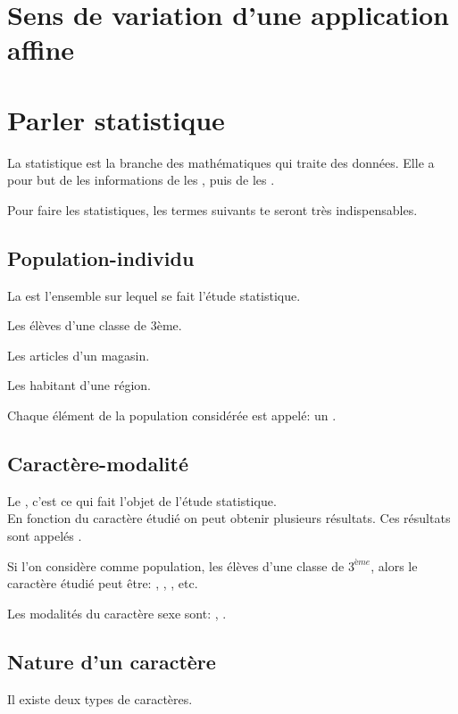 \documentclass[12pt,a4paper]{report}
\begin{document}
\chapter{Sens de variation d'une application affine}

\chapter{Parler statistique}
La statistique est la branche des mathématiques qui traite des données. Elle a pour but de  les informations de les , puis de les .
\par
Pour faire les statistiques, les termes suivants te seront très indispensables.

\section{Population-individu}
La  est l'ensemble sur lequel se fait l'étude statistique.\\

\begin{exemples}
\item Les élèves d'une classe de 3ème.
\item Les articles d'un magasin.
\item Les habitant d'une région.
\end{exemples}

Chaque élément de la population considérée est appelé: un .

\section{Caractère-modalité}
Le , c'est ce qui fait l'objet de l'étude statistique.\\
En fonction du caractère étudié on peut obtenir plusieurs résultats. Ces résultats sont appelés .

\begin{exemples}
\item Si l'on considère comme population, les élèves d'une classe de $3^{ème}$, alors le caractère étudié peut être: , , , etc.
\item Les modalités du caractère sexe sont: , .
\end{exemples}

\section{Nature d'un caractère}
Il existe deux types de caractères.
\end{document}
